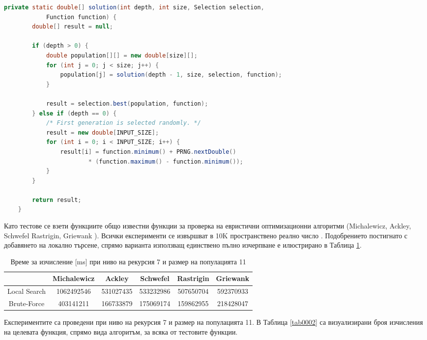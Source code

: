 \begin{lstlisting}[caption=Йерархична селекция, language=Java, basicstyle=\tiny, label=list0013]
	private static double[] solution(int depth, int size, Selection selection,
			Function function) {
		double[] result = null;

		if (depth > 0) {
			double population[][] = new double[size][];
			for (int j = 0; j < size; j++) {
				population[j] = solution(depth - 1, size, selection, function);
			}

			result = selection.best(population, function);
		} else if (depth == 0) {
			/* First generation is selected randomly. */
			result = new double[INPUT_SIZE];
			for (int i = 0; i < INPUT_SIZE; i++) {
				result[i] = function.minimum() + PRNG.nextDouble()
						* (function.maximum() - function.minimum());
			}
		}

		return result;
	}
\end{lstlisting}

Като тестове се взети функциите общо известни функции за проверка на евристични оптимизационни алгоритми (Michalewicz, Ackley, Schwefel Rastrigin, Griewank \cite{Balabanov-01}). Всички експерименти се извършват в 10K пространствено реално число \cite{Tomov-01}. Подобрението постигнато с добавянето на локално търсене, спрямо варианта използващ единствено пълно изчерпване е илюстрирано в Таблица \ref{tab0001}.

\begin{table}[h!]
\begin{tabular}{ | c | c | c | c | c | c | }
\hline
& \cellcolor{gray!15}Michalewicz & \cellcolor{gray!15}Ackley & \cellcolor{gray!15}Schwefel & \cellcolor{gray!15}Rastrigin & \cellcolor{gray!15}Griewank \\ [0.05ex] 
\hline
\hline
Local Search & 1062492546 & 531027435 & 533232986 & 507650704 & 592370933 \\  
\hline
Brute-Force & 403141211 & 166733879 & 175069174 & 159862955 & 218428047 \\  
\hline
\end{tabular}
\caption{Време за изчисление [ms] при ниво на рекурсия 7 и размер на популацията 11}
\label{tab0001}
\end{table}

Експериментите са проведени при ниво на рекурсия 7 и размер на популацията 11. В Таблица \ref{tab0002} са визуализирани броя изчисления на целевата функция, спрямо вида алгоритъм, за всяка от тестовите функции. 

